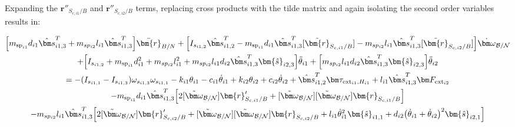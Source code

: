 Expanding the $\bm{r}''_{S_{c,i1}/B}$ and $\bm{r}''_{S_{c,i2}/B}$ terms, replacing cross products with the tilde matrix and again isolating the second order variables results in:

\begin{multline}
	\Big[m_{\text{sp}_{i1}} d_{i1} \hat{\bm s}_{i1,3}^T + m_{sp_{i2}} l_{i1} \hat{\bm s}_{i1,3}^T \Big] \ddot{\bm{r}}_{B/N} + \Big[I_{s_{i1,2}} \hat{\bm s}_{i1,2}^T - m_{\text{sp}_{i1}} d_{i1} \hat{\bm s}_{i1,3}^T [\tilde{\bm{r}}_{S_{c,i1}/B}] - m_{sp_{i2}} l_{i1} \hat{\bm s}_{i1,3}^T [\tilde{\bm{r}}_{S_{c,i2}/B}] \Big]\dot{\bm\omega}_{\cal B/N} \\
	+ \Big[I_{s_{i1,2}}+ m_{\text{sp}_{i1}} d_{i1}^2 + m_{sp_{i2}} l_{i1}^2 + m_{sp_{i2}} l_{i1} d_{i2} \hat{\bm s}_{i1,3}^T \bm{\hat{s}}_{i2,3} \Big] \ddot\theta_{i1} + \Big[m_{sp_{i2}} l_{i1} d_{i2} \hat{\bm s}_{i1,3}^T \bm{\hat{s}}_{i2,3} \Big] \ddot{\theta}_{i2}\\
	= - (I_{s_{i1,1}} - I_{s_{i1,3}}) \omega_{s_{i1,3}} \omega_{s_{i1,1}} - k_{i1} \theta_{i1} - c_{i1}\dot{\theta}_{i1}
	+  k_{i2} \theta_{i2} + c_{i2} \dot\theta_{i2}
	+ \hat{\bm s}_{i1,2}^T \bm \tau_{\text{ext}_{i1},H_{i1}} + l_{i1} \hat{\bm s}_{i1,3}^T \bm F_{\text{ext}_{i2}}\\
	- m_{\text{sp}_{i1}} d_{i1} \hat{\bm s}_{i1,3}^T \Big[2 [\tilde{\bm\omega}_{\cal B/N}] \bm{r}'_{S_{c,i1}/B}
	+ [\tilde{\bm\omega}_{\cal B/N}] [\tilde{\bm\omega}_{\cal B/N}] \bm{r}_{S_{c,i1}/B}\Big]
	\\
	- m_{sp_{i2}} l_{i1} \hat{\bm s}_{i1,3}^T \Big[ 2 [\tilde{\bm\omega}_{\cal B/N}] \bm{r}'_{S_{c,i2}/B}
	+ [\tilde{\bm\omega}_{\cal B/N}] [\tilde{\bm\omega}_{\cal B/N}] \bm{r}_{S_{c,i2}/B} + l_{i1} \dot{\theta}_{i1}^2 \bm{\hat{s}}_{i1,1} + d_{i2}\big(\dot{\theta}_{i1} + \dot{\theta}_{i2}\big)^2\bm{\hat{s}}_{i2,1}\Big]
	\label{eq:solar_panel_final10}
\end{multline}

